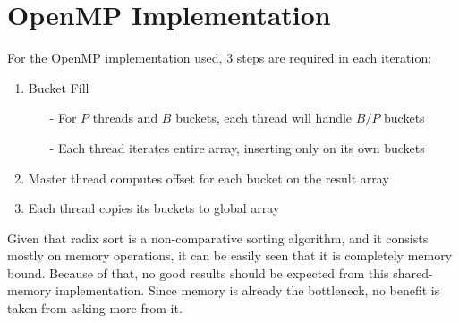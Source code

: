 \section{OpenMP Implementation}
\label{sec:omp}

For the OpenMP implementation used, 3 steps are required in each iteration:

\begin{enumerate}
	\item Bucket Fill
	\begin{itemize}
		\item[-] For $P$ threads and $B$ buckets, each thread will handle $B/P$ buckets
		\item[-] Each thread iterates entire array, inserting only on its own buckets
	\end{itemize}

	\item Master thread computes offset for each bucket on the result array

	\item Each thread copies its buckets to global array
\end{enumerate}

Given that radix sort is a non-comparative sorting algorithm, and it consists mostly on memory operations, it can be easily seen that it is completely memory bound. Because of that, no good results should be expected from this shared-memory implementation. Since memory is already the bottleneck, no benefit is taken from asking more from it.
